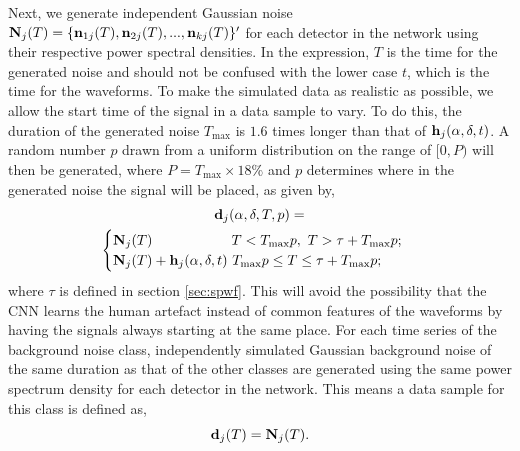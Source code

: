 \documentclass[aps,twocolumn,showpacs,groupedaddress, nofootinbib]{revtex4}  %
\begin{document}
%
Next, we generate independent Gaussian noise $\bold{N}_j(T) =
\{\bold{n}_{1j}(T), \bold{n}_{2j}(T), ..., \bold{n}_{kj}(T)\}'$ for each
detector in the network using their respective power spectral
densities. In the expression, $T$ is the time for the generated noise and should not be confused with the lower case $t$, 
which is the time for the waveforms.
To make the simulated data as realistic as possible, 
we allow the start time of the signal in a data sample to vary.
To do this,  the duration of the generated noise $T_{\text{max}}$ is $1.6$ times longer than
that of $\bold{h}_j(\alpha, \delta, t)$. A random number $p$ drawn from 
a uniform distribution on the range of $[0, P)$ 
will then be generated, where
$P = T_{\text{max}}\times 18\% $  and $p$ 
determines where in
the generated noise the signal will be placed, as given by,
%
\begin{multline}
\bold{d}_j(\alpha, \delta, T, p)=
\\
\begin{cases}
\bold{N}_j(T)~~~~~~~~~~~~~~~~~T < T_{\text{max}} p,~T > \tau + T_{\text{max}} p; \\
\bold{N}_j(T) + \bold{h}_j(\alpha, \delta, t)~ T_{\text{max}} p \leq T \leq \tau + T_{\text{max}} p; \\
\end{cases}
\end{multline}
%
where $\tau$ is defined in section \ref{sec:spwf}. 
This will avoid the possibility that the \ac{CNN}
learns the human artefact instead of common features of the waveforms by having
the signals always starting at the same place.
For each time series of the background noise class, independently simulated Gaussian
background noise of the
same duration as that of the other classes are generated using the same power spectrum density 
for each detector in the network. This means a data sample for this class is defined as,
%
\begin{equation}\label{eq:noise}
 \bold{d}_j(T) = \bold{N}_j(T).
\end{equation}
\end{document}
